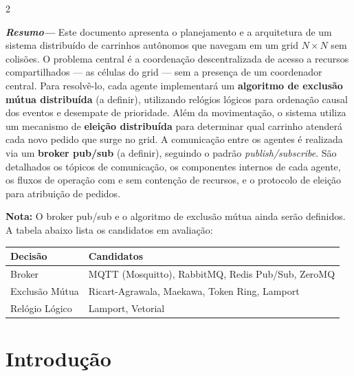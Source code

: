 \documentclass[a4paper]{article}
\begin{document}
\begin{multicols}{2}
\setlength{\columnsep}{0.5cm}

\noindent \textbf{\textit{Resumo---}} Este documento apresenta o planejamento e a arquitetura de um sistema distribu\'ido de carrinhos aut\^onomos que navegam em um grid $N \times N$ sem colis\~oes. O problema central \'e a coordena\c{c}\~ao descentralizada de acesso a recursos compartilhados --- as c\'elulas do grid --- sem a presen\c{c}a de um coordenador central. Para resolv\^e-lo, cada agente implementar\'a um \textbf{algoritmo de exclus\~ao m\'utua distribu\'ida} (a definir), utilizando rel\'ogios l\'ogicos para ordena\c{c}\~ao causal dos eventos e desempate de prioridade. Al\'em da movimenta\c{c}\~ao, o sistema utiliza um mecanismo de \textbf{elei\c{c}\~ao distribu\'ida} para determinar qual carrinho atender\'a cada novo pedido que surge no grid. A comunica\c{c}\~ao entre os agentes \'e realizada via um \textbf{broker pub/sub} (a definir), seguindo o padr\~ao \textit{publish/subscribe}. S\~ao detalhados os t\'opicos de comunica\c{c}\~ao, os componentes internos de cada agente, os fluxos de opera\c{c}\~ao com e sem conten\c{c}\~ao de recursos, e o protocolo de elei\c{c}\~ao para atribui\c{c}\~ao de pedidos.

\vspace{0.3em}
\noindent \textbf{Nota:} O broker pub/sub e o algoritmo de exclus\~ao m\'utua ainda ser\~ao definidos. A tabela abaixo lista os candidatos em avalia\c{c}\~ao:

\vspace{0.3em}
\noindent
\begin{minipage}{\columnwidth}
\centering
\begin{tabular}{|l|p{4.2cm}|}
\hline
\textbf{Decis\~ao} & \textbf{Candidatos} \\ \hline
Broker & MQTT (Mosquitto), RabbitMQ, Redis Pub/Sub, ZeroMQ \\ \hline
Exclus\~ao M\'utua & Ricart-Agrawala, Maekawa, Token Ring, Lamport \\ \hline
Rel\'ogio L\'ogico & Lamport, Vetorial \\ \hline
\end{tabular}
\end{minipage}
\vspace{0.3em}


\section{Introdu\c{c}\~ao}


\end{multicols}
\end{document}
